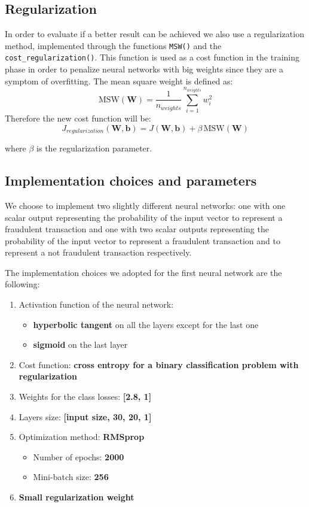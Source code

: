 \documentclass{Configuration_Files/PoliMi3i_thesis}
\begin{document}
\subsection{Regularization}
In order to evaluate if a better result can be achieved we also use a regularization method, implemented through the functions \verb|MSW()| and the \verb|cost_regularization()|. This function is used as a cost function in the training phase in order to penalize neural networks with big weights since they are a symptom of overfitting.
The mean square weight is defined as:
$$\mathrm{MSW}(\textbf{W}) = \frac{1}{n_{weights}} \sum_{i=1}^{n_{weights}} w_i^2$$
Therefore the new cost function will be:
$$J_{regularization}(\textbf{W}, \textbf{b}) = J(\textbf{W}, \textbf{b}) + \beta \,\mathrm{MSW}(\textbf{W})$$

where $\beta$ is the regularization parameter.

\subsection{Implementation choices and parameters}
We choose to implement two slightly different neural networks: one with one scalar output representing the probability of the input vector to represent a fraudulent transaction and one with two scalar outputs  representing the probability of the input vector to represent a fraudulent transaction and to represent a not fraudulent transaction respectively.

The implementation choices we adopted for the first neural network are the following:
\begin{enumerate}
    \item Activation function of the neural network: 
    \begin{itemize}
        \item\textbf{hyperbolic tangent} on all the layers except for the last one
        \item\textbf{sigmoid} on the last layer
    \end{itemize}
    \item Cost function: \textbf{cross entropy for a binary classification problem with regularization}
    \item Weights for the class losses: \textbf{[2.8, 1]}
    \item Layers size: \textbf{[input size, 30, 20, 1]}
    \item Optimization method: \textbf{RMSprop}
    \begin{itemize}
        \item Number of epochs: \textbf{2000}
        \item Mini-batch size: \textbf{256}
    \end{itemize}
    \item \textbf{Small regularization weight}
\end{enumerate}
\end{document}
